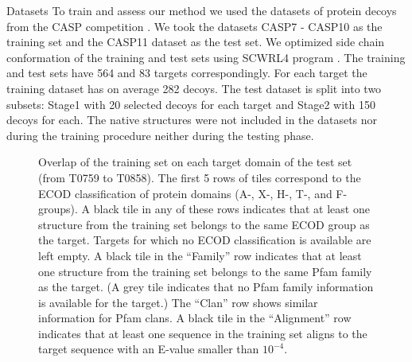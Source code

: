 \documentclass[final, unknownkeysallowed]{beamer}
\begin{document}
\begin{frame}{}
\begin{textblock}{39.0}
\begin{block}{Datasets}
   To train and assess our method we used the datasets of protein decoys from the CASP competition \cite{moult2014critical}. 
We took the datasets CASP7 - CASP10 as the training set and the CASP11 dataset as the test set.
We optimized side chain conformation of the training and test sets using SCWRL4 program \cite{krivov2009improved}.
The training and test sets have 564 and 83 targets correspondingly. For each target the training dataset has 
on average 282 decoys. The test dataset is split into two subsets: Stage1 with 20 selected decoys for each target and Stage2 with 150 decoys
for each. The native structures were not included in the datasets nor during the training procedure
neither during the testing phase.
\begin{figure}[H]
%
    \caption{Overlap of the training set on each target domain of the
    test set (from T0759 to T0858). The first 5 rows of tiles
    correspond to the ECOD classification of protein domains (A-, X-,
    H-, T-, and F-groups). A black tile in any of these rows indicates
    that at least one structure from the training set belongs to the
    same ECOD group as the target. Targets for which no ECOD
    classification is available are left empty.
    A black tile in the ``Family'' row indicates that at least one
    structure from the training set belongs to the same Pfam family as
    the target. (A grey tile indicates that no Pfam family information
    is available for the target.) The ``Clan'' row shows similar
    information for Pfam clans. A black tile in the ``Alignment'' row
    indicates that at least one sequence in the training set aligns to
    the target sequence with an E-value smaller than $10^{-4}$.}
%
    \label{Fig:summaryTable}
\end{figure}


\end{block}
\end{textblock}
\end{frame}
\end{document}

